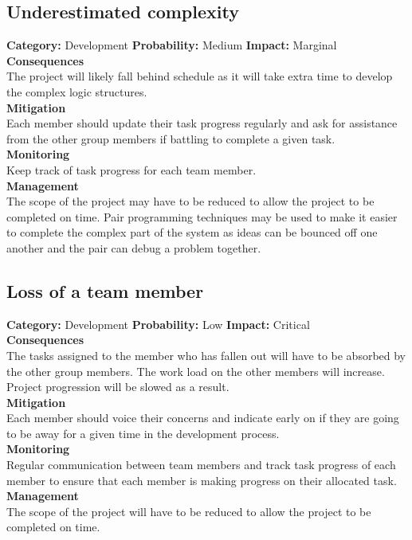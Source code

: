 \documentclass[a4paper,10pt]{article}
\begin{document}
\subsection{Underestimated complexity}
\textbf{Category:} Development\newline
\textbf{Probability:} Medium\newline
\textbf{Impact:} Marginal
\\\textbf{Consequences}\\
The project will likely fall behind schedule as it will take extra time to develop the complex logic structures. 
\smallskip\\\textbf{Mitigation}\\
Each member should update their task progress regularly and ask for assistance from the other group members if battling to complete a given task.
\smallskip\\\textbf{Monitoring}\\
Keep track of task progress for each team member.
\smallskip\\\textbf{Management}\\
The scope of the project may have to be reduced to allow the project to be completed on time. Pair programming techniques may be used to make it easier to complete the complex part of the system as ideas can be bounced off one another and the pair can debug a problem together.

\subsection{Loss of a team member}
\textbf{Category:} Development\newline
\textbf{Probability:} Low\newline
\textbf{Impact:} Critical
\\\textbf{Consequences}\\
The tasks assigned to the member who has fallen out will have to be absorbed by the other group members. The work load on the other members will increase. Project progression will be slowed as a result.
\smallskip\\\textbf{Mitigation}\\
Each member should voice their concerns and indicate early on if they are going to be away for a given time in the development process.
\smallskip\\\textbf{Monitoring}\\
Regular communication between team members and track task progress of each member to ensure that each member is making progress on their allocated task.
\smallskip\\\textbf{Management}\\
The scope of the project will have to be reduced to allow the project to be completed on time. 
\end{document}
